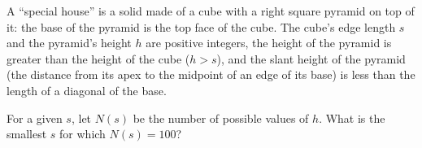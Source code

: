 A ``special house'' is a solid made of a cube with a right square pyramid on top of it: the base of the pyramid is the top face of the cube. The cube's edge length $s$ and the pyramid's height $h$ are positive integers, the height of the pyramid is greater than the height of the cube ($h>s$), and the slant height of the pyramid (the distance from its apex to the midpoint of an edge of its base) is less than the length of a diagonal of the base.

For a given $s$, let $N(s)$ be the number of possible values of $h$. What is the smallest $s$ for which $N(s)=100$?

